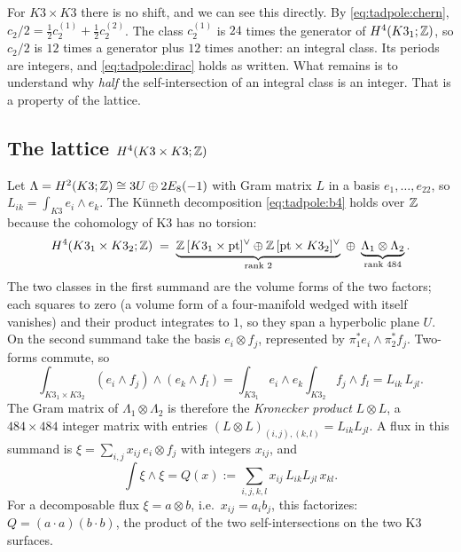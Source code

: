 For $K3\times K3$ there is no shift, and we can see this directly. By
\eqref{eq:tadpole:chern}, $c_2/2=\tfrac12c_2^{(1)}+\tfrac12c_2^{(2)}$. The class
$c_2^{(1)}$ is $24$ times the generator of $H^4(K3_1;\mathbb{Z})$, so $c_2/2$ is $12$ times a
generator plus $12$ times another: an integral class. Its periods are integers, and
\eqref{eq:tadpole:dirac} holds as written. What remains is to understand why \emph{half} the
self-intersection of an integral class is an integer. That is a property of the lattice.

\subsection{The lattice \texorpdfstring{$H^4(K3\times K3;\mathbb{Z})$}{H4(K3 x K3; Z)}}
Let $\Lambda=H^2(K3;\mathbb{Z})\cong3U\oplus2E_8(-1)$ with Gram matrix $L$ in a basis $e_1,\dots,
e_{22}$, so $L_{ik}=\int_{K3}e_i\wedge e_k$. The K\"unneth decomposition
\eqref{eq:tadpole:b4} holds over $\mathbb{Z}$ because the cohomology of K3 has no torsion:
\begin{equation}\label{eq:tadpole:H4}
 H^4(K3_1\times K3_2;\mathbb{Z})\;=\;\underbrace{\mathbb{Z}\,[K3_1\times\mathrm{pt}]^\vee\oplus
 \mathbb{Z}\,[\mathrm{pt}\times K3_2]^\vee}_{\text{rank }2}\;\oplus\;
 \underbrace{\Lambda_1\otimes\Lambda_2}_{\text{rank }484}.
\end{equation}
The two classes in the first summand are the volume forms of the two factors; each squares
to zero (a volume form of a four-manifold wedged with itself vanishes) and their product
integrates to $1$, so they span a hyperbolic plane $U$. On the second summand take the basis
$e_i\otimes f_j$, represented by $\pi_1^*e_i\wedge\pi_2^*f_j$. Two-forms commute, so
\begin{equation}\label{eq:tadpole:kron}
 \int_{K3_1\times K3_2}(e_i\wedge f_j)\wedge(e_k\wedge f_l)
 =\int_{K3_1}e_i\wedge e_k\int_{K3_2}f_j\wedge f_l=L_{ik}\,L_{jl} .
\end{equation}
The Gram matrix of $\Lambda_1\otimes\Lambda_2$ is therefore the \emph{Kronecker product}
$L\otimes L$, a $484\times484$ integer matrix with entries
$(L\otimes L)_{(i,j),(k,l)}=L_{ik}L_{jl}$. A flux in this summand is
$\xi=\sum_{i,j}x_{ij}\,e_i\otimes f_j$ with integers $x_{ij}$, and
\begin{equation}\label{eq:tadpole:Q}
 \int\xi\wedge\xi=Q(x):=\sum_{i,j,k,l}x_{ij}\,L_{ik}L_{jl}\,x_{kl}.
\end{equation}
For a decomposable flux $\xi=a\otimes b$, i.e.\ $x_{ij}=a_ib_j$, this factorizes:
$Q=(a\cdot a)(b\cdot b)$, the product of the two self-intersections on the two K3 surfaces.

